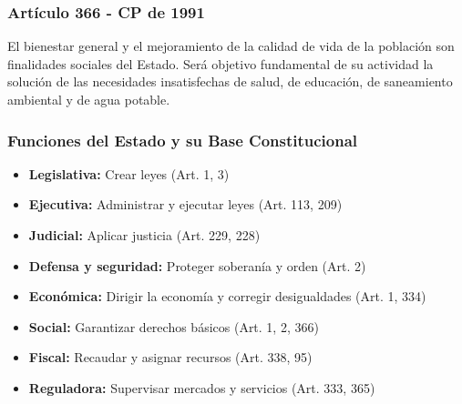 \begin{frame}
  \frametitle{Art\'iculo 366 - CP de 1991}
  El bienestar general y el mejoramiento de la calidad de vida de la poblaci\'on son finalidades sociales del Estado. Ser\'a objetivo fundamental de su actividad la soluci\'on de las necesidades insatisfechas de salud, de educaci\'on, de saneamiento ambiental y de agua potable.
\end{frame}


\begin{frame}
  \frametitle{Funciones del Estado y su Base Constitucional}
  \begin{itemize}
    \item \textbf{Legislativa:} Crear leyes (Art. 1, 3)
    \item \textbf{Ejecutiva:} Administrar y ejecutar leyes (Art. 113, 209)
    \item \textbf{Judicial:} Aplicar justicia (Art. 229, 228)
    \item \textbf{Defensa y seguridad:} Proteger soberan\'ia y orden (Art. 2)
    \item \textbf{Econ\'omica:} Dirigir la econom\'ia y corregir desigualdades (Art. 1, 334)
    \item \textbf{Social:} Garantizar derechos b\'asicos (Art. 1, 2, 366)
    \item \textbf{Fiscal:} Recaudar y asignar recursos (Art. 338, 95)
    \item \textbf{Reguladora:} Supervisar mercados y servicios (Art. 333, 365)
  \end{itemize}
\end{frame}

